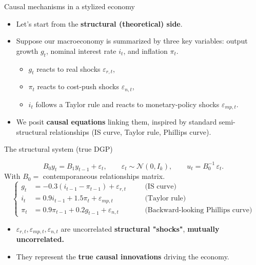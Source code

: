\documentclass{beamer}
\begin{document}
\begin{frame}{Causal mechanisms in a stylized economy}
\small
\begin{itemize}
    \item Let’s start from the \textbf{structural (theoretical) side}.
    \item Suppose our macroeconomy is summarized by three key variables:
          output growth $g_t$, nominal interest rate $i_t$, and inflation $\pi_t$.
          \begin{itemize}
              \item $g_t$ reacts to real shocks $\varepsilon_{r,t}$,
        \item $\pi_t$ reacts to cost-push shocks $\varepsilon_{n,t}$,
        \item $i_t$ follows a Taylor rule and reacts to monetary-policy shocks $\varepsilon_{mp,t}$.
\end{itemize}

    \item We posit \textbf{causal equations} linking them, inspired by
          standard semi-structural relationships (IS curve, Taylor rule, Phillips curve).
\end{itemize}
\end{frame}

\begin{frame}{The structural system (true DGP)}

\[
B_0y_t = B_1 y_{t-1} + \varepsilon_t, \qquad \varepsilon_t \sim \mathcal{N}(0,I_k),
\qquad u_t =  B_0^{-1}\,\varepsilon_t.
\]
With $B_0=$ contemporaneous relationships matrix.
\[
\left\{
\begin{aligned}
g_t &= -0.3(i_{t-1} - \pi_{t-1}) + \varepsilon_{r,t} &\quad &\text{(IS curve)}\\[4pt]
i_t &= 0.9 i_{t-1} + 1.5 \pi_t + \varepsilon_{mp,t} &\quad &\text{(Taylor rule)}\\[4pt]
\pi_t &= 0.9 \pi_{t-1} + 0.2 g_{t-1} + \varepsilon_{n,t} &\quad &\text{(Backward-looking Phillips curve)}
\end{aligned}
\right.
\]
\begin{itemize}
  \item $\varepsilon_{r,t}, \varepsilon_{mp,t}, \varepsilon_{n,t}$ are uncorrelated \textbf{structural "shocks"}, \textbf{mutually uncorrelated.}
  \item They represent the \textbf{true causal innovations} driving the economy.
\end{itemize}
\end{frame}
\end{document}
